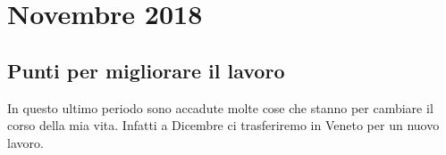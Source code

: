 \section{Novembre 2018}
\subsection{Punti per migliorare il lavoro}
In questo ultimo periodo sono accadute molte cose che stanno per cambiare il corso della mia vita. Infatti a Dicembre ci trasferiremo in Veneto per un nuovo lavoro.